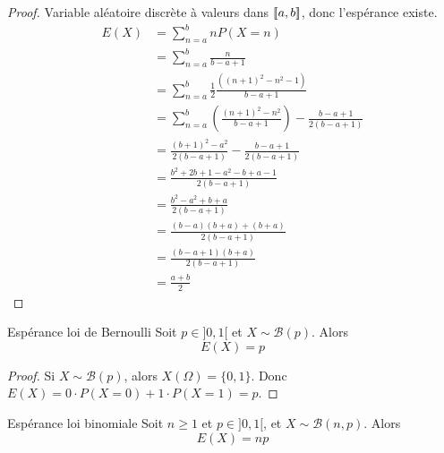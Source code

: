 \begin{proof}
    Variable aléatoire discrète à valeurs dans $[\![a, b]\!]$, donc l'espérance existe. 
    \begin{align}
        E(X) & = \sum_{n = a}^b n P(X = n) \\
        & = \sum_{n = a}^b \frac n {b - a + 1} \\
        & = \sum_{n = a }^{b } \frac 1 2 \frac{((n + 1)^2 - n^2 - 1)}{b - a + 1} \\
        & = \sum_{n = a }^{b } \left( \frac {(n + 1)^2 - n^2}{b - a + 1} \right) - \frac {b - a + 1} {2 (b - a + 1)} \\
        & = \frac{(b + 1)^2 - a^2}{2 (b - a + 1)} - \frac{b - a + 1}{2 (b - a + 1)} \\
        & = \frac{b^2 + 2b + 1 - a^2 - b + a - 1}{2 (b - a + 1)} \\
        & = \frac{b^2 - a^2 + b + a}{2 (b - a + 1)} \\
        & = \frac{(b - a)(b + a) + (b + a)}{2 ( b - a + 1)} \\
        & = \frac{(b - a + 1)(b + a)}{2 (b - a + 1)} \\
        & = \frac{a + b}{2}
    \end{align}

\end{proof}

\begin{proposition}{Espérance loi de Bernoulli}{}
    Soit $p \in ]0, 1[$ et $X \sim \mathcal B(p)$. Alors 
    $$ E(X) = p $$
\end{proposition}

\begin{proof}
    Si $X \sim \mathcal B(p)$, alors $X(\Omega) = \{0, 1\}$.
    Donc $E(X) = 0 \cdot P(X = 0) + 1 \cdot P(X = 1) = p$.
\end{proof}

\begin{proposition}{Espérance loi binomiale}{}
    Soit $n \geqslant 1$ et $p \in ]0, 1[$, et $X \sim \mathcal B(n, p)$. Alors 
    $$ E(X) = n p $$
\end{proposition}

